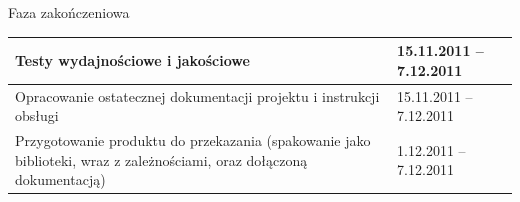 	Faza zakończeniowa
	\begin{longtable}{|p{85mm}|p{42mm}|} \hline
	
    Testy wydajnościowe i jakościowe &
    15.11.2011 -- 7.12.2011
    \\ \hline
	
    Opracowanie ostatecznej dokumentacji projektu i instrukcji obsługi
    & 15.11.2011 -- 7.12.2011
    \\ \hline
	
	Przygotowanie produktu do przekazania (spakowanie jako biblioteki, wraz z
	zależnościami, oraz dołączoną dokumentacją)
	& 1.12.2011 -- 7.12.2011
    \\ \hline
    
	\end{longtable}